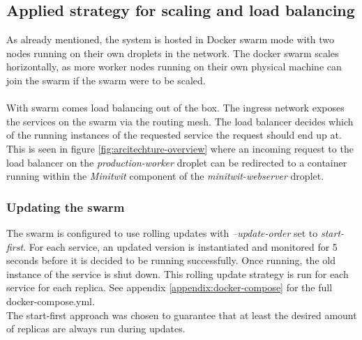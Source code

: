 \subsection{Applied strategy for scaling and load balancing}
As already mentioned, the system is hosted in Docker swarm mode with two nodes running on their own droplets in the network. The docker swarm scales horizontally, as more worker nodes running on their own physical machine can join the swarm if the swarm were to be scaled. \\
\\
With swarm comes load balancing out of the box. The ingress network exposes the services on the swarm via the routing mesh. The load balancer decides which of the running instances of the requested service the request should end up at\cite{docker-ingress}. This is seen in figure \ref{fig:arcitechture-overview} where an incoming request to the load balancer on the \textit{production-worker} droplet can be redirected to a container running within the \textit{Minitwit} component of the \textit{minitwit-webserver} droplet.

\subsubsection{Updating the swarm}
The swarm is configured to use rolling updates with \textit{--update-order} set to \textit{start-first}. For each service, an updated version is instantiated and monitored for 5 seconds before it is decided to be running successfully. Once running, the old instance of the service is shut down. This rolling update strategy is run for each service for each replica. See appendix \ref{appendix:docker-compose} for the full docker-compose.yml.\\
The start-first approach was chosen to guarantee that at least the desired amount of replicas are always run during updates.